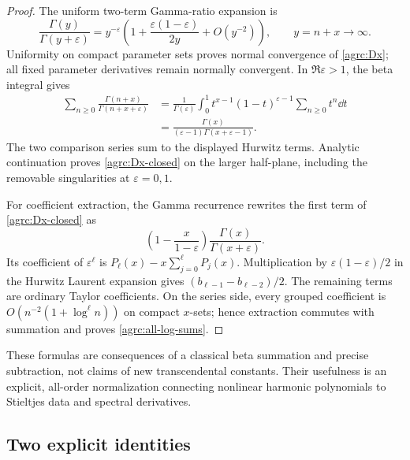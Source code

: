 \begin{proof}
The uniform two-term Gamma-ratio expansion is
\[
 \frac{\Gamma(y)}{\Gamma(y+\varepsilon)}
 =y^{-\varepsilon}\left(1+
         \frac{\varepsilon(1-\varepsilon)}{2y}+O(y^{-2})\right),
 \qquad y=n+x\longrightarrow\infty.
\]
Uniformity on compact parameter sets proves normal convergence of
\eqref{agrc:Dx}; all fixed parameter derivatives remain normally
convergent. In $\Re\varepsilon>1$, the beta integral gives
\begin{align*}
 \sum_{n\geq0}\frac{\Gamma(n+x)}{\Gamma(n+x+\varepsilon)}
 &=\frac1{\Gamma(\varepsilon)}\int_0^1
        t^{x-1}(1-t)^{\varepsilon-1}\sum_{n\geq0}t^n\dd t\\
 &=\frac{\Gamma(x)}{(\varepsilon-1)\Gamma(x+\varepsilon-1)}.
\end{align*}
The two comparison series sum to the displayed Hurwitz terms. Analytic
continuation proves \eqref{agrc:Dx-closed} on the larger half-plane,
including the removable singularities at $\varepsilon=0,1$.

For coefficient extraction, the Gamma recurrence rewrites the first
term of \eqref{agrc:Dx-closed} as
\[
 \left(1-\frac{x}{1-\varepsilon}\right)
          \frac{\Gamma(x)}{\Gamma(x+\varepsilon)}.
\]
Its coefficient of $\varepsilon^\ell$ is
$P_\ell(x)-x\sum_{j=0}^{\ell}P_j(x)$. Multiplication by
$\varepsilon(1-\varepsilon)/2$ in the Hurwitz Laurent expansion gives
$(b_{\ell-1}-b_{\ell-2})/2$. The remaining terms are ordinary Taylor
coefficients. On the series side, every grouped coefficient is
$O(n^{-2}(1+\log^\ell n))$ on compact $x$-sets; hence extraction commutes
with summation and proves \eqref{agrc:all-log-sums}.
\end{proof}

These formulas are consequences of a classical beta summation and
precise subtraction, not claims of new transcendental constants.
Their usefulness is an explicit, all-order normalization connecting
nonlinear harmonic polynomials to Stieltjes data and spectral derivatives.

\subsection{Two explicit identities}

